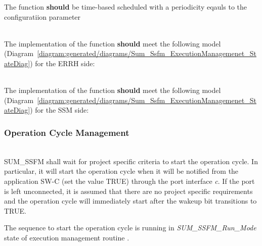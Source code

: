The function  \textbf{should} be time-based scheduled with a periodicity eqauls to the configuratiion parameter 

\\
The implementation of the function  \textbf{should} meet the following model (Diagram~\ref{diagram:generated/diagrams/Sum_Ssfm_ExecutionManagemenet_StateDiag}) for the ERRH side:

{   }

\\
The implementation of the function  \textbf{should} meet the following model (Diagram~\ref{diagram:generated/diagrams/Sum_Ssfm_ExecutionManagemenet_StateDiag}) for the SSM side:

{ }


{   }

\subsubsection{Operation Cycle Management}
\\
\label{sec:OperationCycleManagementDynamic}
SUM_SSFM shall wait for project specific criteria to start the operation cycle. In particular, it will start the operation cycle when it will be notified from the application SW-C (set the value TRUE) through the port interface \textit{c}. If the port
is left unconnected, it is assumed that there are no project specific requirements and the operation cycle will immediately start after the wakeup bit transitions to TRUE.

The sequence to start the operation cycle is running in \textit{SUM_SSFM_Run_Mode} state of execution management routine .

{}

